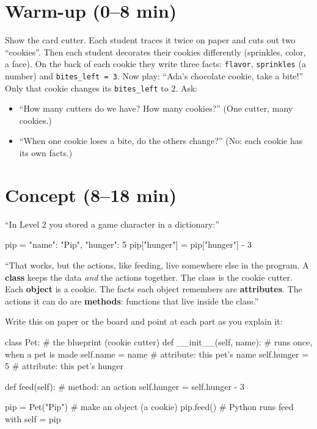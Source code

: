 \section{Warm-up (0--8 min)}
\begin{unplugged}
Show the card cutter. Each student traces it twice on paper and cuts out two \enquote{cookies}. Then each student decorates their cookies differently (sprinkles, color, a face). On the back of each cookie they write three facts: \texttt{flavor}, \texttt{sprinkles} (a number) and \texttt{bites\_left = 3}.
Now play: \enquote{Ada's chocolate cookie, take a bite!} Only that cookie changes its \texttt{bites\_left} to 2. Ask:
\begin{itemize}[itemsep=1pt]
  \item \enquote{How many cutters do we have? How many cookies?} (One cutter, many cookies.)
  \item \enquote{When one cookie loses a bite, do the others change?} (No: each cookie has its own facts.)
\end{itemize}
\end{unplugged}

\section{Concept (8--18 min)}
\begin{teacherscript}
\enquote{In Level 2 you stored a game character in a dictionary:}
\begin{pycode}
pip = {"name": "Pip", "hunger": 5}
pip["hunger"] = pip["hunger"] - 3
\end{pycode}
\enquote{That works, but the actions, like feeding, live somewhere else in the program. A \textbf{class} keeps the data \emph{and} the actions together. The class is the cookie cutter. Each \textbf{object} is a cookie. The facts each object remembers are \textbf{attributes}. The actions it can do are \textbf{methods}: functions that live inside the class.}
\end{teacherscript}
Write this on paper or the board and point at each part as you explain it:
\begin{pycode}
class Pet:                          # the blueprint (cookie cutter)
    def __init__(self, name):       # runs once, when a pet is made
        self.name = name            # attribute: this pet's name
        self.hunger = 5             # attribute: this pet's hunger

    def feed(self):                 # method: an action
        self.hunger = self.hunger - 3

pip = Pet("Pip")                    # make an object (a cookie)
pip.feed()                          # Python runs feed with self = pip
\end{pycode}

